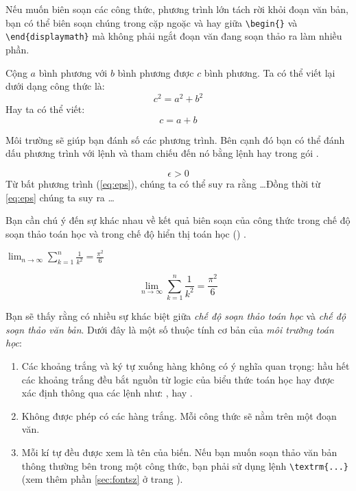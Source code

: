 Nếu muốn biên soạn các công thức, phương trình lớn tách rời khỏi đoạn văn bản, bạn có thể biên soạn chúng trong cặp ngoặc \ci{[} và \ci{]} hay giữa \verb|\begin{|\verb|}| và \verb|\end{displaymath}| mà không phải ngắt đoạn văn đang soạn thảo ra làm nhiều phần.

\begin{example}
Cộng $a$ bình phương với
$b$ bình phương được $c$
bình phương. Ta
có thể viết lại dưới dạng
công thức là:
\begin{displaymath}
c^{2}=a^{2}+b^{2}
\end{displaymath}
Hay ta có thể viết: \[c=a+b\]
\end{example}
Môi trường  sẽ giúp bạn đánh số các phương trình. Bên cạnh đó bạn có thể đánh dấu phương trình với lệnh  và tham chiếu đến nó bằng lệnh  hay  trong gói .

\begin{example}
\begin{equation} \label{eq:eps}
\epsilon > 0
\end{equation}
Từ bất phương trình (\ref{eq:eps}),
chúng ta có thể suy ra rằng
\ldots Đồng thời từ
\eqref{eq:eps}
chúng ta suy ra \ldots
\end{example}

Bạn cần chú ý đến sự khác nhau về kết quả biên soạn của công thức trong chế độ soạn thảo toán học và trong chế độ hiển thị toán học () .

\begin{example}
$\lim_{n \to \infty}
\sum_{k=1}^n \frac{1}{k^2}
= \frac{\pi^2}{6}$
\end{example}
\begin{example}
\begin{displaymath}
\lim_{n \to \infty}
\sum_{k=1}^n \frac{1}{k^2}
= \frac{\pi^2}{6}
\end{displaymath}
\end{example}
Bạn sẽ thấy rằng có nhiều sự khác biệt giữa \emph{chế độ soạn thảo toán học} và \emph{chế độ soạn thảo văn bản}. Dưới đây là một số thuộc tính cơ bản của \emph{môi trường toán học}:

\begin{enumerate}
\item Các khoảng trắng và ký tự xuống hàng không có ý nghĩa quan trọng: hầu hết các khoảng trắng đều bắt nguồn từ logic của biểu thức toán học hay được xác định thông qua các lệnh như: \ci{,} , 
hay .

\item Không được phép có các hàng trắng. Mỗi công thức sẽ nằm trên một đoạn văn.

\item Mỗi kí tự đều được xem là tên của biến. Nếu bạn muốn soạn thảo văn bản thông thường bên trong một công thức, bạn phải sử dụng lệnh \verb|\textrm{...}| (xem thêm phần \ref{sec:fontsz} ở trang \pageref{sec:fontsz}).
\end{enumerate}

